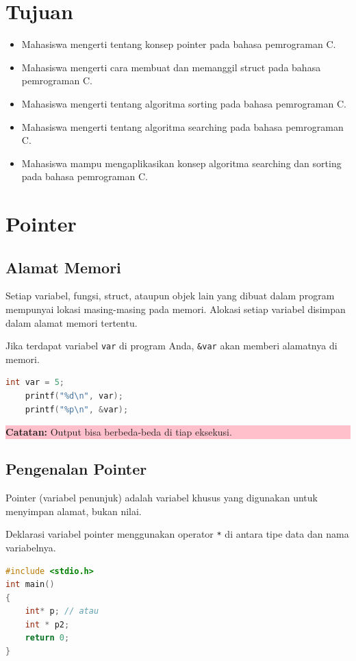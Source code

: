\section{Tujuan}
\begin{itemize}[label=$\bullet$, itemsep=-1pt, leftmargin=*]   
    \item Mahasiswa mengerti tentang konsep pointer pada bahasa pemrograman C.
    \item Mahasiswa mengerti cara membuat dan memanggil struct pada bahasa pemrograman C.
    \item Mahasiswa mengerti tentang algoritma sorting pada bahasa pemrograman C.
    \item Mahasiswa mengerti tentang algoritma searching pada bahasa pemrograman C.
    \item Mahasiswa mampu mengaplikasikan konsep algoritma searching dan sorting pada bahasa pemrograman C.
\end{itemize}

\section{Pointer}
\subsection{Alamat Memori}
Setiap variabel, fungsi, struct, ataupun objek lain yang dibuat dalam program mempunyai lokasi masing-masing pada memori. Alokasi setiap variabel disimpan dalam alamat memori tertentu.

Jika  terdapat variabel \verb|var| di program Anda, \verb|&var| akan memberi alamatnya di memori.
\begin{lstlisting}[language=c]
    int var = 5;
    printf("%d\n", var);
    printf("%p\n", &var);
\end{lstlisting}
\begin{center}
	\colorbox{pink}{\parbox{0.8\linewidth}{\textbf{Catatan:} Output bisa berbeda-beda di tiap eksekusi.}}
\end{center}

\subsection{Pengenalan Pointer} 

Pointer (variabel penunjuk) adalah variabel khusus yang digunakan untuk menyimpan alamat, bukan nilai.

Deklarasi variabel pointer menggunakan operator \verb|*| di antara tipe data dan nama variabelnya.
\begin{lstlisting}[language=c]
	#include <stdio.h>
int main()
{
	int* p; // atau
    int * p2;
	return 0;
}
\end{lstlisting}


